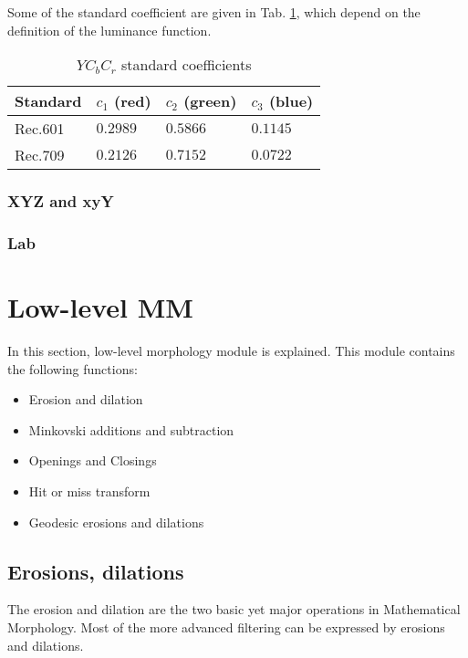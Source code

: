 Some of the standard coefficient are given in Tab. \ref{table:RGB2YCbCr}, which depend on the definition of the luminance function. 
\begin{table}[f]
\begin{center}
    \begin{tabular}[b]{llll}
Standard & $c_1$ (red) & $c_2$ (green) & $c_3$ (blue)\\ \hline
Rec.601  & $0.2989$	& $0.5866$ & $0.1145$\\
Rec.709  & $0.2126$ & $0.7152$ & $0.0722$
    \end{tabular}
\end{center}
\label{table:RGB2YCbCr}
\caption{$YC_{b}C_{r}$ standard coefficients}
\end{table}




\subsection{XYZ and xyY}


\subsection{Lab}



\chapter{Low-level MM}
In this section, low-level morphology module is explained. This module contains the following functions:

\begin{itemize}
\item Erosion and dilation
\item Minkovski additions and subtraction 
\item Openings and Closings
\item Hit or miss transform
\item Geodesic erosions and dilations
\end{itemize}

\section{Erosions, dilations}
\label{sec:erodil}
The erosion and dilation are the two basic yet major operations in Mathematical Morphology. Most of the more advanced filtering can be expressed by erosions and dilations. 

